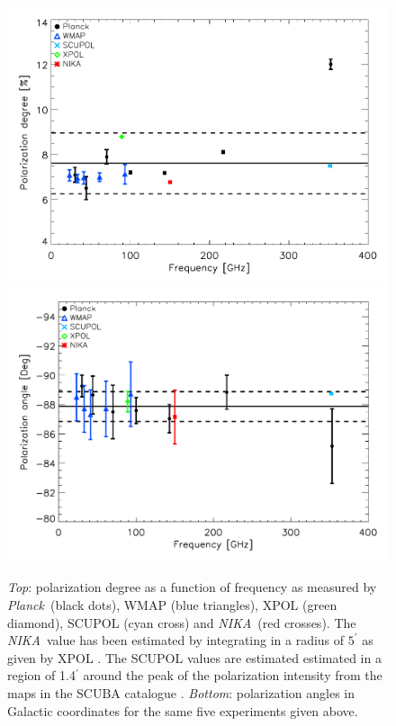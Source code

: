 \documentclass[twocolumn,traditabstract]{aa}
\def\NIKA{\textit{NIKA}}
\def\Planck{\textit{Planck}}
\begin{document}
\begin{figure}
  \centering
          { \includegraphics[width=1\linewidth,keepaspectratio]{figures/pdegree_comparison.pdf}}
          { \includegraphics[width=1\linewidth,keepaspectratio]{figures/angle_comparison.pdf}} 
            \caption{{\it Top}: polarization degree as a function of frequency as measured by \Planck\ (black dots), WMAP (blue triangles), XPOL (green diamond), SCUPOL (cyan cross) and \NIKA\ (red crosses). The \NIKA\ value has been estimated by integrating in a radius of $5^{\prime}$ as given by XPOL \citep{aumont2010}. The SCUPOL  values are estimated estimated in a region of 1.4$^\prime$ around the peak of the polarization intensity from the maps in the SCUBA catalogue \citep{scubapol}.
            {\it Bottom}: polarization angles in Galactic coordinates for the same five experiments given above.}
\label{crab_p_angle_comparison}		
  \end{figure}
\end{document}
